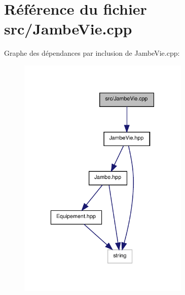 \section{Référence du fichier src/\-Jambe\-Vie.cpp}
\label{_jambe_vie_8cpp}
Graphe des dépendances par inclusion de Jambe\-Vie.\-cpp\-:\nopagebreak
\begin{figure}[H]
\begin{center}
\leavevmode
\includegraphics[width=232pt]{_jambe_vie_8cpp__incl}
\end{center}
\end{figure}
